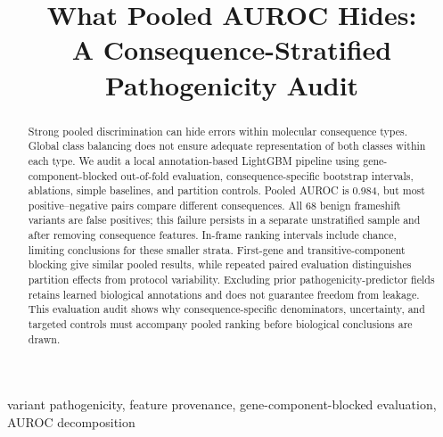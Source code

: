 \documentclass[conference]{IEEEtran}
\newif\ificicanonymous
\begin{document}
\raggedbottom
\title{What Pooled AUROC Hides:\\A Consequence-Stratified Pathogenicity Audit}
\ificicanonymous
  \author{\IEEEauthorblockN{Anonymous submission}}
\else
  
\fi
\maketitle

\begin{abstract}
Strong pooled discrimination can hide errors within molecular consequence types. Global class balancing does not ensure adequate representation of both classes within each type. We audit a local annotation-based LightGBM pipeline using gene-component-blocked out-of-fold evaluation, consequence-specific bootstrap intervals, ablations, simple baselines, and partition controls. Pooled AUROC is 0.984, but most positive--negative pairs compare different consequences. All 68 benign frameshift variants are false positives; this failure persists in a separate unstratified sample and after removing consequence features. In-frame ranking intervals include chance, limiting conclusions for these smaller strata. First-gene and transitive-component blocking give similar pooled results, while repeated paired evaluation distinguishes partition effects from protocol variability. Excluding prior pathogenicity-predictor fields retains learned biological annotations and does not guarantee freedom from leakage. This evaluation audit shows why consequence-specific denominators, uncertainty, and targeted controls must accompany pooled ranking before biological conclusions are drawn.
\end{abstract}

\begin{IEEEkeywords}
variant pathogenicity, feature provenance, gene-component-blocked evaluation, AUROC decomposition
\end{IEEEkeywords}









\end{document}
